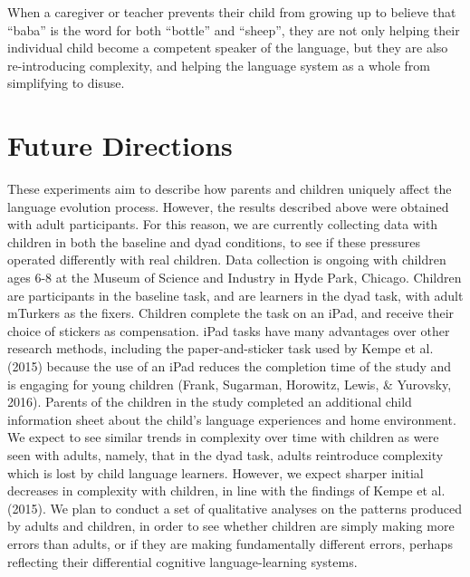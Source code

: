 \documentclass[10pt, letterpaper]{article}
\begin{document}
When a caregiver or teacher prevents their child from growing up to
believe that ``baba'' is the word for both ``bottle'' and ``sheep'',
they are not only helping their individual child become a competent
speaker of the language, but they are also re-introducing complexity,
and helping the language system as a whole from simplifying to disuse.

\hypertarget{future-directions}{%
\section{Future Directions}\label{future-directions}}

These experiments aim to describe how parents and children uniquely
affect the language evolution process. However, the results described
above were obtained with adult participants. For this reason, we are
currently collecting data with children in both the baseline and dyad
conditions, to see if these pressures operated differently with real
children. Data collection is ongoing with children ages 6-8 at the
Museum of Science and Industry in Hyde Park, Chicago. Children are
participants in the baseline task, and are learners in the dyad task,
with adult mTurkers as the fixers. Children complete the task on an
iPad, and receive their choice of stickers as compensation. iPad tasks
have many advantages over other research methods, including the
paper-and-sticker task used by Kempe et al. (2015) because the use of an
iPad reduces the completion time of the study and is engaging for young
children (Frank, Sugarman, Horowitz, Lewis, \& Yurovsky, 2016). Parents
of the children in the study completed an additional child information
sheet about the child's language experiences and home environment. We
expect to see similar trends in complexity over time with children as
were seen with adults, namely, that in the dyad task, adults reintroduce
complexity which is lost by child language learners. However, we expect
sharper initial decreases in complexity with children, in line with the
findings of Kempe et al. (2015). We plan to conduct a set of qualitative
analyses on the patterns produced by adults and children, in order to
see whether children are simply making more errors than adults, or if
they are making fundamentally different errors, perhaps reflecting their
differential cognitive language-learning systems.

\vspace{1em} 
\end{document}
